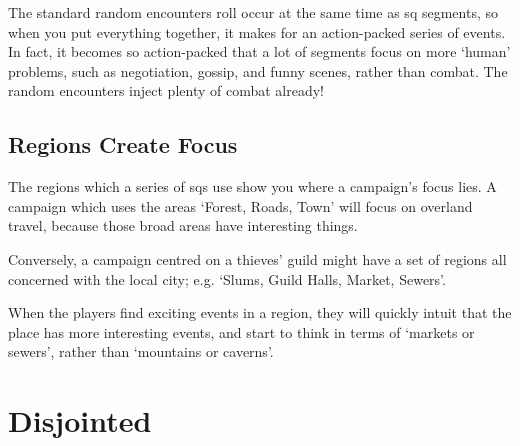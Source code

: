 \begin{multicols}{2}
The standard random encounters roll occur at the same time as \gls{sq} \glspl{segment}, so when you put everything together, it makes for an action-packed series of events.
In fact, it becomes so action-packed that a lot of \glspl{segment} focus on more `human' problems, such as negotiation, gossip, and funny scenes, rather than combat.
The random encounters inject plenty of combat already!

\subsection{Regions Create Focus}

The regions which a series of \glspl{sq} use show you where a campaign's focus lies.
A campaign which uses the areas `Forest, Roads, Town' will focus on overland travel, because those broad areas have interesting things.

Conversely, a campaign centred on a thieves' guild might have a set of regions all concerned with the local city; e.g. `Slums, Guild Halls, Market, Sewers'.

When the players find exciting events in a region, they will quickly intuit that the place has more interesting events, and start to think in terms of `markets or sewers', rather than `mountains or caverns'.

\end{multicols}

\section{Disjointed }

